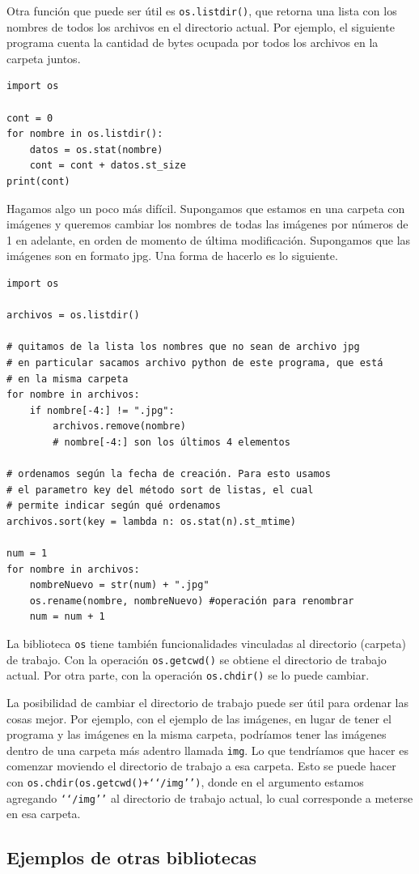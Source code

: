 \documentclass[a4paper, 12pt]{report}
\theoremstyle{definition}
\begin{document}
Otra función que puede ser útil es {\tt os.listdir()}, que retorna una lista con los nombres de todos los archivos en el directorio actual. Por ejemplo, el siguiente programa cuenta la cantidad de bytes ocupada por todos los archivos en la carpeta juntos.
\begin{verbatim}
import os

cont = 0
for nombre in os.listdir():
    datos = os.stat(nombre)
    cont = cont + datos.st_size
print(cont)
\end{verbatim}

Hagamos algo un poco más difícil. Supongamos que estamos en una carpeta con imágenes y queremos cambiar los nombres de todas las imágenes por números de 1 en adelante, en orden de momento de última modificación. Supongamos que las imágenes son en formato jpg. Una forma de hacerlo es lo siguiente.
\begin{verbatim}
import os

archivos = os.listdir()

# quitamos de la lista los nombres que no sean de archivo jpg
# en particular sacamos archivo python de este programa, que está
# en la misma carpeta
for nombre in archivos:
    if nombre[-4:] != ".jpg":
        archivos.remove(nombre)
        # nombre[-4:] son los últimos 4 elementos

# ordenamos según la fecha de creación. Para esto usamos
# el parametro key del método sort de listas, el cual
# permite indicar según qué ordenamos
archivos.sort(key = lambda n: os.stat(n).st_mtime)

num = 1
for nombre in archivos:
    nombreNuevo = str(num) + ".jpg"
    os.rename(nombre, nombreNuevo) #operación para renombrar
    num = num + 1
\end{verbatim}

La biblioteca {\tt os} tiene también funcionalidades vinculadas al directorio (carpeta) de trabajo. Con la operación {\tt os.getcwd()} se obtiene el directorio de trabajo actual. Por otra parte, con la operación {\tt os.chdir()} se lo puede cambiar.

La posibilidad de cambiar el directorio de trabajo puede ser útil para ordenar las cosas mejor. Por ejemplo, con el ejemplo de las imágenes, en lugar de tener el programa y las imágenes en la misma carpeta, podríamos tener las imágenes dentro de una carpeta más adentro llamada {\tt img}. Lo que tendríamos que hacer es comenzar moviendo el directorio de trabajo a esa carpeta. Esto se puede hacer con {\tt os.chdir(os.getcwd()+\lq\lq/img\rq\rq)}, donde en el argumento estamos agregando {\tt \lq\lq/img\rq\rq} al directorio de trabajo actual, lo cual corresponde a meterse en esa carpeta.
\subsection{Ejemplos de otras bibliotecas}
\end{document}
